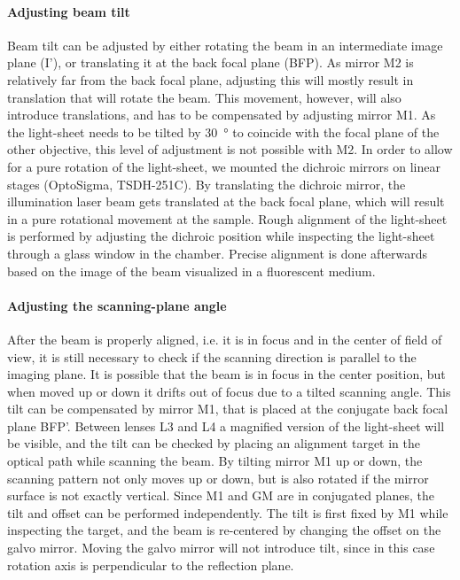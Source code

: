     \paragraph{Adjusting beam tilt}
      Beam tilt can be adjusted by either rotating the beam in an intermediate image plane (I'), or translating it at the back focal plane (BFP). As mirror M2 is relatively far from the back focal plane, adjusting this will mostly result in translation that will rotate the beam. This movement, however, will also introduce translations, and has to be compensated by adjusting mirror M1. As the light-sheet needs to be tilted by \SI{30}{\degree} to coincide with the focal plane of the other objective, this level of adjustment is not possible with M2. In order to allow for a pure rotation of the light-sheet, we mounted the dichroic mirrors on linear stages (OptoSigma, TSDH-251C). By translating the dichroic mirror, the illumination laser beam gets translated at the back focal plane, which will result in a pure rotational movement at the sample. Rough alignment of the light-sheet is performed by adjusting the dichroic position while inspecting the light-sheet through a glass window in the chamber. Precise alignment is done afterwards based on the image of the beam visualized in a fluorescent medium.




    \paragraph{Adjusting the scanning-plane angle}
      After the beam is properly aligned, i.e. it is in focus and in the center of field of view, it is still necessary to check if the scanning direction is parallel to the imaging plane. It is possible that the beam is in focus in the center position, but when moved up or down it drifts out of focus due to a tilted scanning angle. This tilt can be compensated by mirror M1, that is placed at the conjugate back focal plane BFP'. Between lenses L3 and L4 a magnified version of the light-sheet will be visible, and the tilt can be checked by placing an alignment target in the optical path while scanning the beam. By tilting mirror M1 up or down, the scanning pattern not only moves up or down, but is also rotated if the mirror surface is not exactly vertical. Since M1 and GM are in conjugated planes, the tilt and offset can be performed independently. The tilt is first fixed by M1 while inspecting the target, and the beam is re-centered by changing the offset on the galvo mirror. Moving the galvo mirror will not introduce tilt, since in this case rotation axis is perpendicular to the reflection plane.




